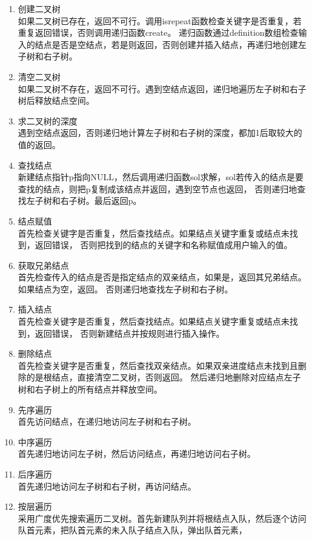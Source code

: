 \documentclass[supercite]{Experimental_Report}
\theoremstyle{definition}
\begin{document}
\begin{enumerate}
	\item 创建二叉树\\
	如果二叉树已存在，返回不可行。调用isrepeat函数检查关键字是否重复，若重复返回错误，否则调用递归函数create。
	递归函数通过definition数组检查输入的结点是否是空结点，若是则返回，否则创建并插入结点，再递归地创建左子树和右子树。
	\item 清空二叉树\\
	如果二叉树不存在，返回不可行。遇到空结点返回，递归地遍历左子树和右子树后释放结点空间。
	\item 求二叉树的深度\\
	遇到空结点返回，否则递归地计算左子树和右子树的深度，都加1后取较大的值的返回。
	\item 查找结点\\
	新建结点指针p指向NULL，然后调用递归函数sol求解，sol若传入的结点是要查找的结点，则把p复制成该结点并返回，遇到空节点也返回，
	否则递归地查找左子树和右子树。最后返回p。
	\item 结点赋值\\
	首先检查关键字是否重复，然后查找结点。如果结点关键字重复或结点未找到，返回错误，
	否则把找到的结点的关键字和名称赋值成用户输入的值。
	\item 获取兄弟结点\\
	首先检查传入的结点是否是指定结点的双亲结点，如果是，返回其兄弟结点。如果结点为空，返回。
	否则递归地查找左子树和右子树。
	\item 插入结点\\
	首先检查关键字是否重复，然后查找结点。如果结点关键字重复或结点未找到，返回错误，
	否则新建结点并按规则进行插入操作。
	\item 删除结点\\
	首先检查关键字是否重复，然后查找双亲结点。如果双亲进度结点未找到且删除的是根结点，直接清空二叉树，否则返回。
	然后递归地删除对应结点左子树和右子树上的所有结点并释放空间。
	\item 先序遍历\\
	首先访问结点，在递归地访问左子树和右子树。
	\item 中序遍历\\
	首先递归地访问左子树，然后访问结点，再递归地访问右子树。
	\item 后序遍历\\
	首先递归地访问左子树和右子树，再访问结点。
	\item 按层遍历\\
	采用广度优先搜索遍历二叉树。首先新建队列并将根结点入队，然后逐个访问队首元素，把队首元素的未入队子结点入队，弹出队首元素，

\end{enumerate}
\end{document}
